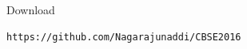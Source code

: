 \documentclass[journal,12pt,twocolumn]{IEEEtran}
\begin{document}
%
Download 
\begin{lstlisting}
https://github.com/Nagarajunaddi/CBSE2016
\end{lstlisting}
\end{document}
